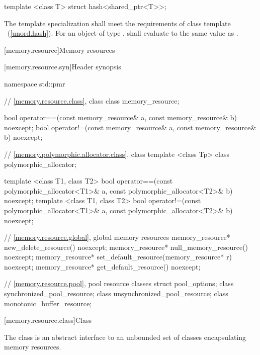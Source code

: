 %
\begin{itemdecl}
template <class T> struct hash<shared_ptr<T>>;
\end{itemdecl}

\begin{itemdescr}
\pnum
The template specialization shall meet the requirements of class
template ~(\ref{unord.hash}). For an object  of type ,
 shall evaluate to
the same value as .
\end{itemdescr}%

[memory.resource]{Memory resources}

[memory.resource.syn]{Header  synopsis}

%
\begin{codeblock}
namespace std::pmr {
  // \ref{memory.resource.class}, class 
  class memory_resource;

  bool operator==(const memory_resource& a, const memory_resource& b) noexcept;
  bool operator!=(const memory_resource& a, const memory_resource& b) noexcept;

  // \ref{memory.polymorphic.allocator.class}, class 
  template <class Tp> class polymorphic_allocator;

  template <class T1, class T2>
    bool operator==(const polymorphic_allocator<T1>& a,
                    const polymorphic_allocator<T2>& b) noexcept;
  template <class T1, class T2>
    bool operator!=(const polymorphic_allocator<T1>& a,
                    const polymorphic_allocator<T2>& b) noexcept;

  // \ref{memory.resource.global}, global memory resources
  memory_resource* new_delete_resource() noexcept;
  memory_resource* null_memory_resource() noexcept;
  memory_resource* set_default_resource(memory_resource* r) noexcept;
  memory_resource* get_default_resource() noexcept;

  // \ref{memory.resource.pool}, pool resource classes
  struct pool_options;
  class synchronized_pool_resource;
  class unsynchronized_pool_resource;
  class monotonic_buffer_resource;
}
\end{codeblock}

[memory.resource.class]{Class }

\pnum
The  class is an abstract interface to an unbounded set of classes encapsulating memory resources.

